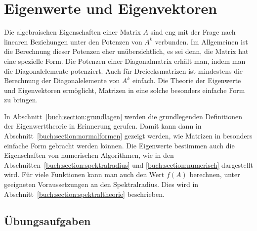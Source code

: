 %
%
%
\chapter{Eigenwerte und Eigenvektoren
\label{buch:chapter:eigenwerte-und-eigenvektoren}}
\rhead{}
Die algebraischen Eigenschaften einer Matrix $A$ sind eng mit der
Frage nach linearen Beziehungen unter den Potenzen von $A^k$ verbunden.
Im Allgemeinen ist die Berechnung dieser Potenzen eher unübersichtlich,
es sei denn, die Matrix hat eine spezielle Form.
Die Potenzen einer Diagonalmatrix erhält man, indem man die Diagonalelemente
potenziert.
Auch für Dreiecksmatrizen ist mindestens die Berechnung der Diagonalelemente
von $A^k$ einfach.
Die Theorie der Eigenwerte und Eigenvektoren ermöglicht, Matrizen in
eine solche besonders einfache Form zu bringen.

In Abschnitt~\ref{buch:section:grundlagen} werden die grundlegenden
Definitionen der Eigenwerttheorie in Erinnerung gerufen.
Damit kann dann in Abschnitt~\ref{buch:section:normalformen}
gezeigt werden, wie Matrizen in besonders einfache Form gebracht
werden können.
Die Eigenwerte bestimmen auch die Eigenschaften von numerischen
Algorithmen, wie in den Abschnitten~\ref{buch:section:spektralradius}
und \ref{buch:section:numerisch} dargestellt wird.
Für viele Funktionen kann man auch den Wert $f(A)$ berechnen, unter
geeigneten Voraussetzungen an den Spektralradius.
Dies wird in Abschnitt~\ref{buch:section:spektraltheorie} beschrieben.






%

\section*{Übungsaufgaben}
\begin{uebungsaufgaben}
\end{uebungsaufgaben}


